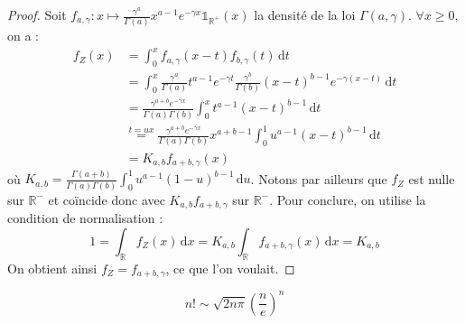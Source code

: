 	\begin{proof}
		Soit $f_{a,\gamma} : x \mapsto \frac{\gamma^a}{\Gamma(a)} x^{a-1} e^{-\gamma x} \mathbb{1}_{\mathbb{R}^+}(x)$ la densité de la loi $\Gamma(a, \gamma)$. $\forall x \geq 0$, on a :
		\begin{align*}
			f_Z(x) & = \int_0^x f_{a, \gamma}(x-t)f_{b, \gamma}(t) \, \mathrm{d}t \\
			& = \int_0^x \frac{\gamma^a}{\Gamma(a)} t^{a-1} e^{-\gamma t} \frac{\gamma^b}{\Gamma(b)} (x-t)^{b-1} e^{-\gamma (x-t)} \, \mathrm{d}t \\
			& = \frac{\gamma^{a+b} e^{-\gamma x}}{\Gamma(a) \Gamma(b)} \int_0^x t^{a-1} (x-t)^{b-1} \, \mathrm{d}t \\
			& \overset{t=ux}{=} \frac{\gamma^{a+b} e^{-\gamma x}}{\Gamma(a) \Gamma(b)} x^{a+b-1} \int_0^1 u^{a-1} (x-t)^{b-1} \, \mathrm{d}t \\
			& = K_{a,b} f_{a+b, \gamma}(x)
		\end{align*}
		où $K_{a,b} = \frac{\Gamma(a+b)}{\Gamma(a) \Gamma(b)} \int_0^1 u^{a-1} (1-u)^{b-1} \, \mathrm{d}u$. Notons par ailleurs que $f_Z$ est nulle sur $\mathbb{R}^-$ et coïncide donc avec $K_{a,b} f_{a+b, \gamma}$ sur $\mathbb{R}^-$.
		\newpar
		Pour conclure, on utilise la condition de normalisation :
		\[ 1 = \int_{\mathbb{R}} f_Z(x) \, \mathrm{d}x = K_{a,b} \int_{\mathbb{R}} f_{a+b, \gamma}(x) \, \mathrm{d}x = K_{a,b} \]
		On obtient ainsi $f_Z = f_{a+b, \gamma}$, ce que l'on voulait.
	\end{proof}


	\begin{theorem}
		\[ n! \sim \sqrt{2n\pi} \left(\frac{n}{e} \right)^n \]
	\end{theorem}

